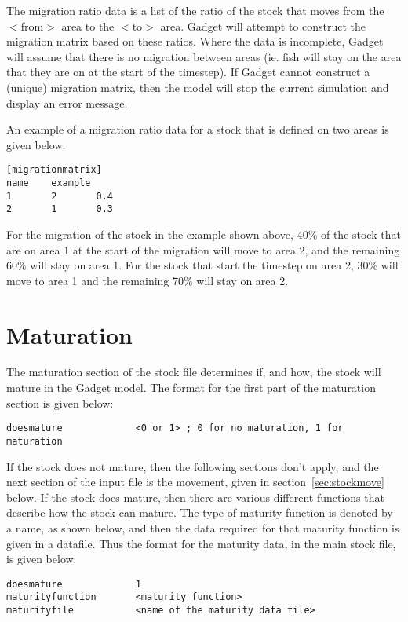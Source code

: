 \documentclass[10pt,twoside]{book}
\begin{document}
The migration ratio data is a list of the ratio of the stock that moves from the $<$from$>$ area to the $<$to$>$ area.  Gadget will attempt to construct the migration matrix based on these ratios.  Where the data is incomplete, Gadget will assume that there is no migration between areas (ie. fish will stay on the area that they are on at the start of the timestep).  If Gadget cannot construct a (unique) migration matrix, then the model will stop the current simulation and display an error message.

\bigskip
An example of a migration ratio data for a stock that is defined on two areas is given below:

{\small\begin{verbatim}
[migrationmatrix]
name    example
1       2       0.4
2       1       0.3
\end{verbatim}}

For the migration of the stock in the example shown above, 40\% of the stock that are on area 1 at the start of the migration will move to area 2, and the  remaining 60\% will stay on area 1.  For the stock that start the timestep on area 2, 30\% will move to area 1 and the remaining 70\% will stay on area 2.

\section{Maturation}\label{sec:stockmature}
The maturation section of the stock file determines if, and how, the stock will mature in the Gadget model. The format for the first part of the maturation section is given below:

{\small\begin{verbatim}
doesmature             <0 or 1> ; 0 for no maturation, 1 for maturation
\end{verbatim}}

If the stock does not mature, then the following sections don't apply, and the next section of the input file is the movement, given in section~\ref{sec:stockmove} below.  If the stock does mature, then there are various different functions that describe how the stock can mature.  The type of maturity function is denoted by a name, as shown below, and then the data required for that maturity function is given in a datafile.  Thus the format for the maturity data, in the main stock file, is given below:

{\small\begin{verbatim}
doesmature             1
maturityfunction       <maturity function>
maturityfile           <name of the maturity data file>
\end{verbatim}}
\end{document}

